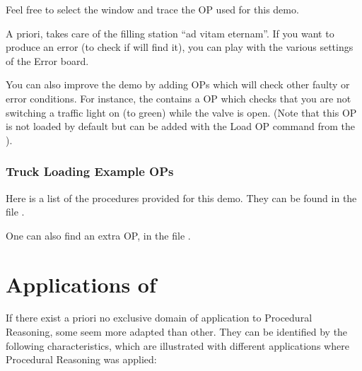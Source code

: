 Feel free to select the \XPK{} window and trace the OP used for this demo.

A priori, \CPK{} takes care of the filling station ``ad vitam eternam''. If you
want to produce an error (to check if \COPRS will find it), you can play with
the various settings of the Error board.

You can also improve the demo by adding OPs which will check other faulty or
error conditions. For instance, the 
contains a OP which checks that you are not switching a traffic light on (to
green) while the valve is open. (Note that this OP is not loaded by default but
can be added with the Load OP command from the \XPK{}).

\subsection{Truck Loading Example OPs}

Here is a list of the procedures provided for this demo. They can be found in
the file .



One can also find an extra OP, in the file .



\chapter{Applications of \COPRS{}}

If there exist a priori no exclusive domain of application to Procedural
Reasoning, some seem more adapted than other. They can be identified by
the following characteristics, which are illustrated with different
applications where Procedural Reasoning was applied:

